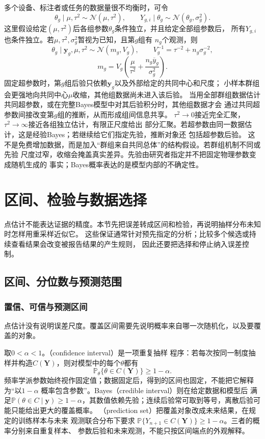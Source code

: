 多个设备、标注者或任务的数据量很不均衡时，可令
\[
  \theta_g\mid\mu,\tau^2\sim\mathcal N(\mu,\tau^2),\qquad
  Y_{g,i}\mid\theta_g\sim\mathcal N(\theta_g,\sigma_g^2).
\]
这里假设给定\((\mu,\tau^2)\)后各组参数\(\theta_g\)条件独立，并且给定全部组参数后，
所有\(Y_{g,i}\)也条件独立。若\(\mu,\tau^2,\sigma_g^2\)暂视为已知，且第\(g\)组有
\(n_g\)个观测，则
\[
  \theta_g\mid\bm y_g,\mu,\tau^2
  \sim\mathcal N(m_g,V_g),\qquad
  V_g^{-1}=\tau^{-2}+n_g\sigma_g^{-2},
\]
\[
  m_g
  =V_g\left(\frac{\mu}{\tau^2}
    +\frac{n_g\overline y_g}{\sigma_g^2}\right).
\]
固定超参数时，第\(g\)组后验只依赖\(\bm y_g\)以及外部给定的共同中心和尺度；
小样本群组会更强地向共同中心\(\mu\)收缩，其他组数据尚未进入该后验。
当用全部群组数据估计共同超参数，或在完整Bayes模型中对其后验积分时，其他组数据才会
通过共同超参数间接改变第\(g\)组的推断，从而形成组间信息共享。
\(\tau^2\to0\)接近完全汇聚，\(\tau^2\to\infty\)接近各组独立估计，有限正尺度给出
部分汇聚。若超参数由同一数据估计，这是经验Bayes；若继续给它们指定先验，推断对象还
包括超参数后验。
这不是免费增加数据，而是加入“群组来自共同总体”的结构假设。若群组机制不同或先验
尺度过窄，收缩会掩盖真实差异。先验由研究者指定并不把固定物理参数变成随机生成的
事实；Bayes概率表达的是模型内部的不确定性。

\section{区间、检验与数据选择}
\label{sec:stats-uncertainty-testing-selection}

点估计不能表达证据的精度。本节先把误差转成区间和检验，再说明抽样分布未知时怎样用重采样近似它。
这些保证通常针对预先指定的分析；比较多个候选或持续查看结果会改变被报告结果的产生规则，
因此还要把选择和停止纳入误差控制。

\subsection{区间、分位数与预测范围}
\label{sec:statistics-intervals-quantiles}

\subsubsection{置信、可信与预测区间}

点估计没有说明误差尺度。覆盖区间需要先说明概率来自哪一次随机化，以及要覆盖的对象。
\begin{definition}[置信、可信与预测覆盖]
  \label{def:statistics-interval-coverage}
  取\(0<\alpha<1\)。（confidence interval）是一项重复抽样
程序：若每次按同一制度抽样并构造\(C(\bm Y)\)，则对模型中的每个\(\theta\)都有
\[
  \mathbb{P}_\theta\{\theta\in C(\bm Y)\}\geq1-\alpha.
\]
频率学派参数始终视作固定值；数据固定后，得到的区间也固定，不能把它解释为“以\(1-\alpha\)
概率包含参数”。Bayes（credible interval）则在给定数据和模型后
满足\(\mathbb{P}(\theta\in C\mid\bm y)\geq1-\alpha\)，其数值依赖先验；连续后验常可取到等号，离散后验可能只能给出更大的覆盖概率。
（prediction set）把覆盖对象改成未来结果，在规定的训练样本与未来
观测联合分布下要求
\(\mathbb{P}\{Y_{n+1}\in C(\bm Y)\}\geq1-\alpha\)。三者的概率分别来自重复样本、
参数后验和未来观测，不能只按区间端点的外观解释。
\end{definition}

